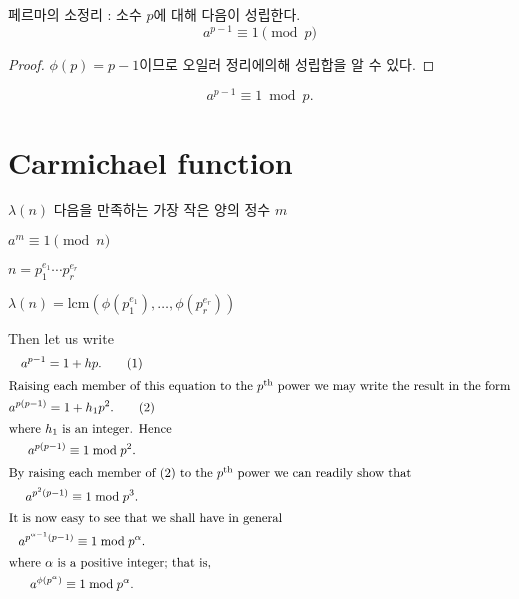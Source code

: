 \begin{corollary}
    페르마의 소정리 :  소수 $p$에 대해 다음이 성립한다.
    $$ a^{p-1} \equiv 1 \pmod{p}$$
\end{corollary}

\begin{proof}
    $\phi(p)  = p-1 $이므로 오일러 정리에의해 성립합을 알 수 있다.
\end{proof}


\begin{equation*}
    a^{p-1} \equiv 1 \bmod p.
\end{equation*}
    






\section{Carmichael function}


$\lambda(n)$ 다음을 만족하는 가장 작은 양의 정수 $m$

$a^m \equiv 1 \pmod{n}$

$n = p_1^{e_1} \cdots p_r^{e_r}$

$\lambda(n) = \text{lcm}(\phi(p_1^{e_1}), \ldots,\phi(p_r^{e_r}))$




Then let us write
\begin{gather}
a^{p-1} = 1 + hp. \tag{1} \\
\intertext{Raising each member of this equation to the
$p^{\text{th}}$ power we may write the result in the form}
a^{p(p-1)} = 1 + h_1p^2. \tag{2} \\
\intertext{where $h_1$ is an integer. Hence}
a^{p(p-1)} \equiv 1 \bmod p^2. \notag \\
\intertext{By raising each member of (2) to the $p^{\text{th}}$
power we can readily show that}
a^{p^2(p-1)} \equiv 1 \bmod p^3. \notag \\
\intertext{It is now easy to see that we shall have in general}
a^{p^{\alpha - 1}(p-1)} \equiv 1 \bmod p^{\alpha}. \notag \\
\intertext{where $\alpha$ is a positive integer; that is,}
a^{\phi(p^{\alpha})} \equiv 1 \bmod p^{\alpha}. \notag
\end{gather}


